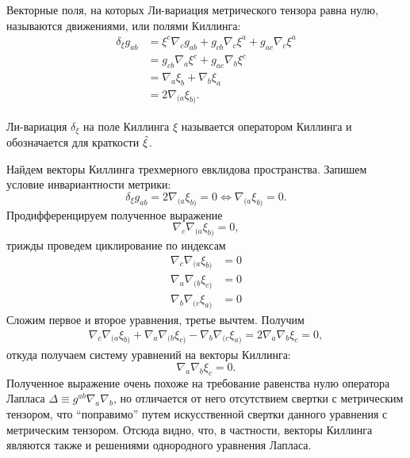 \documentclass[12pt,a4paper]{article}
\begin{document}
        Векторные поля, на которых Ли-вариация метрического тензора равна нулю, называются движениями, или полями Киллинга:
        \begin{equation}\begin{aligned}
            \delta_\xi g_{ab}
                &= \xi^c \nabla_c g_{ab} + g_{cb} \nabla_{c} \xi^a + g_{ac} \nabla_{c} \xi^a \\
                &= g_{cb} \nabla_{a} \xi^c + g_{ac} \nabla_{b} \xi^c \\
                &= \nabla_{a} \xi_b + \nabla_{b} \xi_a \\
                &= 2 \nabla_{(a} \xi_{b)}.
        \end{aligned}\end{equation}

        Ли-вариация $\delta_\xi$ на поле Киллинга $\xi$ называется оператором Киллинга и обозначается для краткости $\hat{\mathbf{\xi}}$.

        Найдем векторы Киллинга трехмерного евклидова пространства. Запишем условие инвариантности метрики:
        \begin{equation}
            \delta_\xi g_{ab}
                = 2 \nabla_{(a} \xi_{b)}
                = 0
                \Leftrightarrow \nabla_{(a} \xi_{b)} = 0.
        \end{equation}
        Продифференцируем полученное выражение
        \begin{equation}
            \nabla_c \nabla_{(a} \xi_{b)} = 0,
        \end{equation}
        трижды проведем циклирование по индексам
        \begin{equation}\begin{aligned}
            \nabla_c \nabla_{(a} \xi_{b)} &= 0 \\
            \nabla_a \nabla_{(b} \xi_{c)} &= 0 \\
            \nabla_b \nabla_{(c} \xi_{a)} &= 0
        \end{aligned}\end{equation}
        Сложим первое и второе уравнения, третье вычтем. Получим
        \begin{equation}\begin{aligned}
            \nabla_c \nabla_{(a} \xi_{b)} +
            \nabla_a \nabla_{(b} \xi_{c)} -
            \nabla_b \nabla_{(c} \xi_{a)} =
            2 \nabla_a \nabla_b \xi_c     = 0,
        \end{aligned}\end{equation}
        откуда получаем систему уравнений на векторы Киллинга:
        \begin{equation}
            \nabla_a \nabla_b \xi_c = 0.
        \end{equation}
        Полученное выражение очень похоже на требование равенства нулю оператора Лапласа $\Delta \equiv g^{ab} \nabla_a \nabla_b$, но отличается от него отсутствием свертки с метрическим тензором, что \enquote{поправимо} путем искусственной свертки данного уравнения с метрическим тензором. Отсюда видно, что, в частности, векторы Киллинга являются также и решениями однородного уравнения Лапласа.
\end{document}
